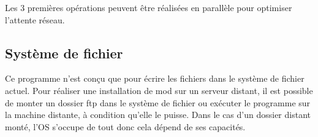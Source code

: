 \documentclass{article}
\begin{document}
Les 3 premières opérations peuvent être réalisées en parallèle pour optimiser l'attente réseau.

\subsection{Système de fichier}
Ce programme n'est conçu que pour écrire les fichiers dans le système de fichier actuel.
Pour réaliser une installation de mod sur un serveur distant, il est possible de monter un dossier ftp dans le système de fichier ou exécuter le programme sur la machine distante, à condition qu'elle le puisse.
Dans le cas d'un dossier distant monté, l'OS s'occupe de tout donc cela dépend de ses capacités.
	
\end{document}
